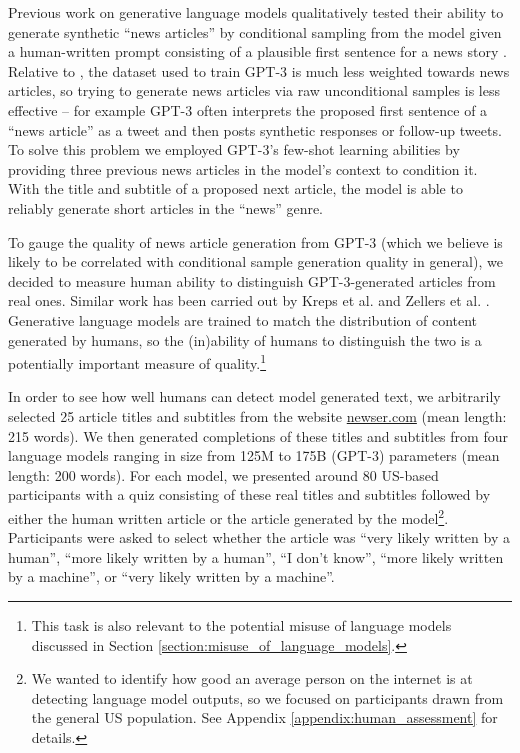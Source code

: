 Previous work on generative language models qualitatively tested their ability to generate synthetic ``news articles'' by conditional sampling from the model given a human-written prompt consisting of a plausible first sentence for a news story \cite{radford2019language}.  Relative to \cite{radford2019language}, the dataset used to train GPT-3 is much less weighted towards news articles, so trying to generate news articles via raw unconditional samples is less effective -- for example GPT-3 often interprets the proposed first sentence of a ``news article'' as a tweet and then posts synthetic responses or follow-up tweets.  To solve this problem we employed GPT-3’s few-shot learning abilities by providing three previous news articles in the model’s context to condition it.  With the title and subtitle of a proposed next article, the model is able to reliably generate short articles in the ``news'' genre.

To gauge the quality of news article generation from GPT-3 (which we believe is likely to be correlated with conditional sample generation quality in general), we decided to measure human ability to distinguish GPT-3-generated articles from real ones. Similar work has been carried out by Kreps et al. \cite{kreps-all-the-news} and Zellers et al. \cite{zellers2019defending}. Generative language models are trained to match the distribution of content generated by humans, so the (in)ability of humans to distinguish the two is a potentially important measure of quality.\footnote{This task is also relevant to the potential misuse of language models discussed in Section \ref{section:misuse_of_language_models}.} 

In order to see how well humans can detect model generated text, we arbitrarily selected 25 article titles and subtitles from the website \href{newser.com}{newser.com} (mean length: 215 words). We then generated completions of these titles and subtitles from four language models ranging in size from 125M to 175B (GPT-3) parameters (mean length: 200 words). For each model, we presented around 80 US-based participants with a quiz consisting of these real titles and subtitles followed by either the human written article or the article generated by the model\footnote{We wanted to identify how good an average person on the internet is at detecting language model outputs, so we focused on participants drawn from the general US population. See Appendix \ref{appendix:human_assessment} for details.}. Participants were asked to select whether the article was ``very likely written by a human'', ``more likely written by a human'', ``I don't know'', ``more likely written by a machine'', or ``very likely written by a machine''.

